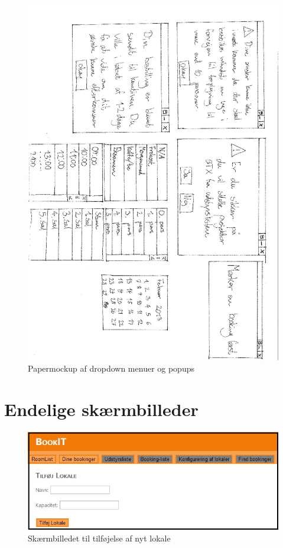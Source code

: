\begin{figure}[h!]
  \centering
    \includegraphics[width=\textwidth]{Appendix/GUI-Prototype/PaperMockup/PopUpDropDowns_002}
  \caption{Papermockup  af dropdown menuer og popups}
\label{App_GUI_paper_PopUpDropDowns}
\end{figure}

\clearpage
\section{Endelige skærmbilleder}
\label{App_GUI_final}

\begin{figure}[h!]
  \centering
    \includegraphics[width=\textwidth]{Appendix/GUI-Prototype/DigitalMockup/AddRoom}
  \caption{Skærmbilledet til tilføjelse af nyt lokale}
\label{App_GUI_final_AddRoom}
\end{figure}

